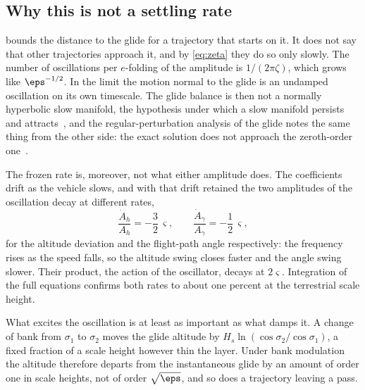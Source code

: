 \subsection{Why this is not a settling rate}\label{sec:residual-settling}

 bounds the distance to the glide for a trajectory that starts
on it. It does not say that other trajectories approach it, and by
\cref{eq:zeta} they do so only slowly. The number of oscillations per
$e$-folding of the amplitude is $1/(2\pi\zeta)$, which grows like
$\eps^{-1/2}$. In the limit the motion normal to the glide is an undamped
oscillation on its own timescale. The glide balance is then not a normally
hyperbolic slow manifold, the hypothesis under which a slow manifold
persists and attracts~\cite{fenichel1979geometric,jones1995geometric}, and
the regular-perturbation analysis of the glide notes the same thing from
the other side: the exact solution does not approach the zeroth-order
one~\cite{lu2006asymptotic}.

The frozen rate is, moreover, not what either amplitude does. The
coefficients drift as the vehicle slows, and with that drift retained the
two amplitudes of the oscillation decay at different rates,
\begin{equation}\label{eq:decay}
  \frac{\dot A_h}{A_h} = -\frac32\,\varsigma ,
  \qquad
  \frac{\dot A_\gamma}{A_\gamma} = -\frac12\,\varsigma ,
\end{equation}
for the altitude deviation and the flight-path angle respectively: the
frequency rises as the speed falls, so the altitude swing closes faster and
the angle swing slower. Their product, the action of the oscillator, decays
at $2\varsigma$. Integration of the full equations confirms both rates to
about one percent at the terrestrial scale height.

What excites the oscillation is at least as important as what damps it. A
change of bank from $\sigma_1$ to $\sigma_2$ moves the glide altitude by
$H_s\ln(\cos\sigma_2/\cos\sigma_1)$, a fixed fraction of a scale height
however thin the layer. Under bank modulation the altitude therefore
departs from the instantaneous glide by an amount of order one in scale
heights, not of order $\sqrt{\eps}$, and so does a trajectory leaving a
pass.


